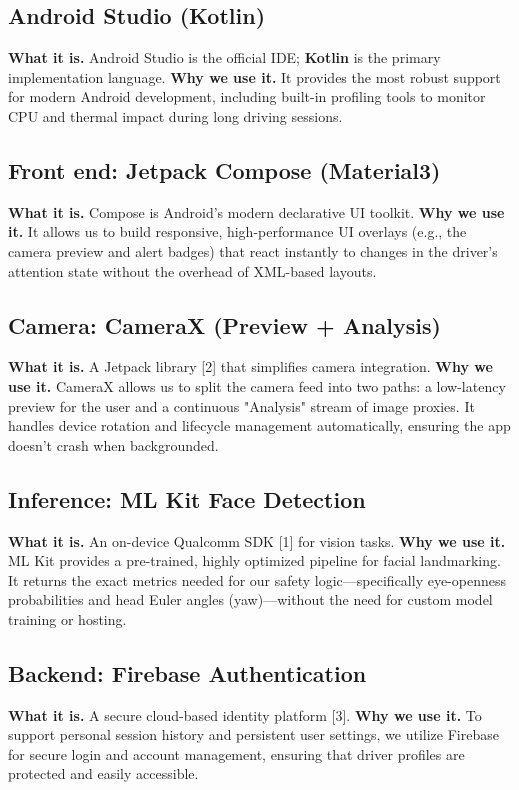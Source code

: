 \documentclass[11pt]{report}
\begin{document}
\subsection{Android Studio (Kotlin)}
\textbf{What it is.} Android Studio is the official IDE; \textbf{Kotlin} is the primary implementation language.
\textbf{Why we use it.} It provides the most robust support for modern Android development, including built-in profiling tools to monitor CPU and thermal impact during long driving sessions.

\subsection{Front end: Jetpack Compose (Material3)}
\textbf{What it is.} Compose is Android’s modern declarative UI toolkit.
\textbf{Why we use it.} It allows us to build responsive, high-performance UI overlays (e.g., the camera preview and alert badges) that react instantly to changes in the driver's attention state without the overhead of XML-based layouts.

\subsection{Camera: CameraX (Preview + Analysis)}
\textbf{What it is.} A Jetpack library [2] that simplifies camera integration.
\textbf{Why we use it.} CameraX allows us to split the camera feed into two paths: a low-latency preview for the user and a continuous "Analysis" stream of image proxies. It handles device rotation and lifecycle management automatically, ensuring the app doesn't crash when backgrounded.

\subsection{Inference: ML Kit Face Detection}
\textbf{What it is.} An on-device Qualcomm SDK [1] for vision tasks.
\textbf{Why we use it.} ML Kit provides a pre-trained, highly optimized pipeline for facial landmarking. It returns the exact metrics needed for our safety logic—specifically eye-openness probabilities and head Euler angles (yaw)—without the need for custom model training or hosting.

\subsection{Backend: Firebase Authentication}
\textbf{What it is.} A secure cloud-based identity platform [3].
\textbf{Why we use it.} To support personal session history and persistent user settings, we utilize Firebase for secure login and account management, ensuring that driver profiles are protected and easily accessible.
\end{document}

